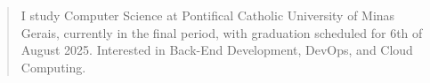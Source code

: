 \begin{quote}
    I study Computer Science at Pontifical Catholic University of Minas Gerais, currently in the final period, with graduation scheduled for 6th of August 2025. Interested in Back-End Development, DevOps, and Cloud Computing.
\end{quote}